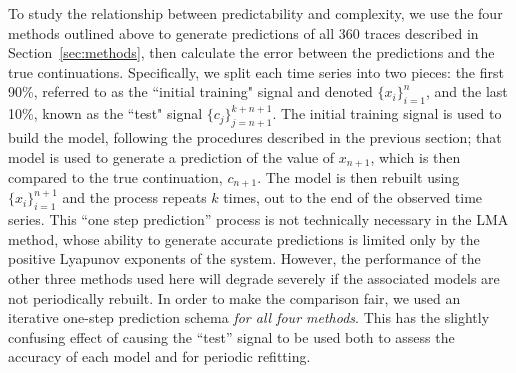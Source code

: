 To study the relationship between predictability and complexity, we
use the four methods outlined above to generate predictions of all 360
traces described in Section~\ref{sec:methods}, then calculate the
error between the predictions and the true continuations.
Specifically, we split each time series into two pieces: the first
90\%, referred to as the ``initial training" signal and denoted
$\{x_i\}_{i=1}^{n}$, and the last 10\%, known as the ``test" signal
$\{c_j\}_{j=n+1}^{k+n+1}$.  The initial training signal is used to
build the model, following the procedures described in the previous
section; that model is used to generate a prediction of the value of
$x_{n+1}$, which is then compared to the true continuation, $c_{n+1}$.
The model is then rebuilt using $\{x_i\}_{i=1}^{n+1}$ and the process
repeats $k$ times, out to the end of the observed time series.  This
``one step prediction'' process is not technically necessary in the
LMA method, whose ability to generate accurate predictions is limited
only by the positive Lyapunov exponents of the system.  However, the
performance of the other three methods used here will degrade severely
if the associated models are not periodically rebuilt.  In order to
make the comparison fair, we used an iterative one-step prediction
schema \emph{for all four methods}.  This has the slightly confusing
effect of causing the ``test'' signal to be used both to assess the
accuracy of each model and for periodic refitting.

